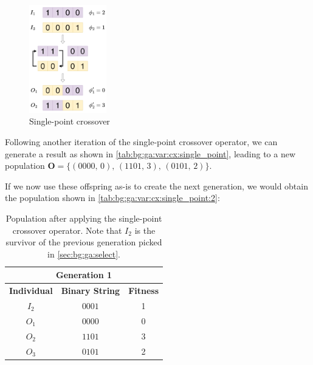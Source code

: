   \begin{figure}[ht!]
    \centering
    \includegraphics[width=0.3\textwidth]
      {img/theoretical_framework/Single-Point Crossover.png}
    \caption{Single-point crossover}
    \label{fig:bg:ga:var:cx:single_point}
  \end{figure}

  Following another iteration of the single-point crossover operator, we can generate a result as shown in 
  \vref{tab:bg:ga:var:cx:single_point}, leading to a new population \(\textbf{O} = \{(0000,\, 0),\, (1101,\, 3),\, 
  (0101,\, 2)\}\).

  If we now use these offspring as-is to create the next generation, we would obtain the population shown in 
  \vref{tab:bg:ga:var:cx:single_point:2}:

  \begin{table}[ht!]
    \centering
    \begin{tabular}{c | c | c }
      \multicolumn{3}{c}{\textbf{Generation 1}} \\
      \hline
      \hline
      \textbf{Individual} & \textbf{Binary String}  & \textbf{Fitness} \\
      \hline
      \(I_2\)             & \(0001\)                & 1 \\
      \(O_1\)             & \(0000\)                & 0 \\
      \(O_2\)             & \(1101\)                & 3 \\
      \(O_3\)             & \(0101\)                & 2
    \end{tabular}
    \caption{
      Population after applying the single-point crossover operator.
      Note that \(I_2\) is the survivor of the previous generation picked in 
      \vref{sec:bg:ga:select}.
    }
    \label{tab:bg:ga:var:cx:single_point:2}
  \end{table}

